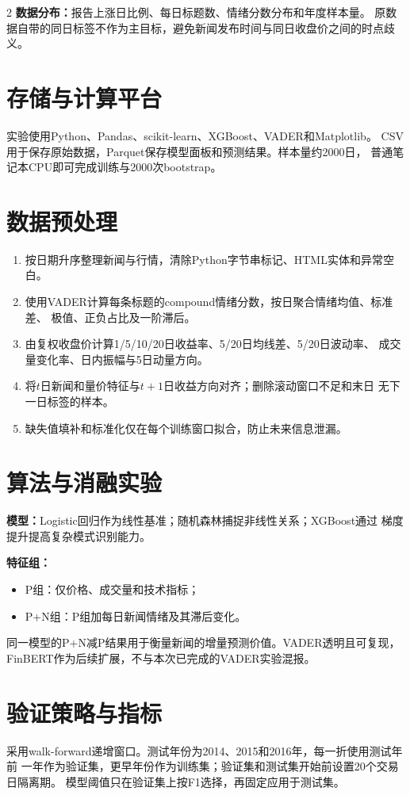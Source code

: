 \documentclass[UTF8,a4paper,10pt,fontset=none]{ctexart}
\newcommand{\key}[1]{\textbf{#1}}
\begin{document}
\begin{multicols}{2}
\key{数据分布：}报告上涨日比例、每日标题数、情绪分数分布和年度样本量。
原数据自带的同日标签不作为主目标，避免新闻发布时间与同日收盘价之间的时点歧义。

\section{存储与计算平台}
实验使用Python、Pandas、scikit-learn、XGBoost、VADER和Matplotlib。
CSV用于保存原始数据，Parquet保存模型面板和预测结果。样本量约2000日，
普通笔记本CPU即可完成训练与2000次bootstrap。

\columnbreak
\section{数据预处理}
\begin{enumerate}
  \item 按日期升序整理新闻与行情，清除Python字节串标记、HTML实体和异常空白。
  \item 使用VADER计算每条标题的compound情绪分数，按日聚合情绪均值、标准差、
  极值、正负占比及一阶滞后。
  \item 由复权收盘价计算1/5/10/20日收益率、5/20日均线差、5/20日波动率、
  成交量变化率、日内振幅与5日动量方向。
  \item 将$t$日新闻和量价特征与$t+1$日收益方向对齐；删除滚动窗口不足和末日
  无下一日标签的样本。
  \item 缺失值填补和标准化仅在每个训练窗口拟合，防止未来信息泄漏。
\end{enumerate}

\section{算法与消融实验}
\key{模型：}Logistic回归作为线性基准；随机森林捕捉非线性关系；XGBoost通过
梯度提升提高复杂模式识别能力\cite{xgboost}。

\key{特征组：}
\begin{itemize}
  \item P组：仅价格、成交量和技术指标；
  \item P+N组：P组加每日新闻情绪及其滞后变化。
\end{itemize}
同一模型的P+N减P结果用于衡量新闻的增量预测价值。VADER透明且可复现，
FinBERT作为后续扩展，不与本次已完成的VADER实验混报。

\section{验证策略与指标}
采用walk-forward递增窗口。测试年份为2014、2015和2016年，每一折使用测试年前
一年作为验证集，更早年份作为训练集；验证集和测试集开始前设置20个交易日隔离期。
模型阈值只在验证集上按F1选择，再固定应用于测试集。


\end{multicols}
\end{document}

